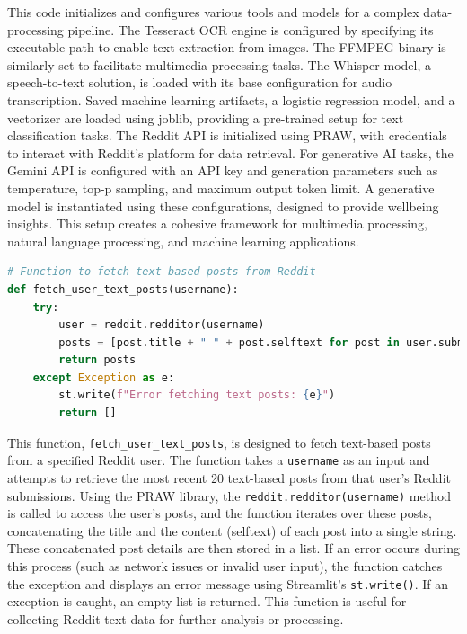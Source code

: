 \noindent
This code initializes and configures various tools and models for a complex data-processing pipeline. The Tesseract OCR engine is configured by specifying its executable path to enable text extraction from images. The FFMPEG binary is similarly set to facilitate multimedia processing tasks. The Whisper model, a speech-to-text solution, is loaded with its base configuration for audio transcription. Saved machine learning artifacts, a logistic regression model, and a vectorizer are loaded using joblib, providing a pre-trained setup for text classification tasks. The Reddit API is initialized using PRAW, with credentials to interact with Reddit's platform for data retrieval. For generative AI tasks, the Gemini API is configured with an API key and generation parameters such as temperature, top-p sampling, and maximum output token limit. A generative model is instantiated using these configurations, designed to provide wellbeing insights. This setup creates a cohesive framework for multimedia processing, natural language processing, and machine learning applications.


\begin{tcolorbox}[colback=gray!5!white, colframe=gray!80!black, boxrule=0.5pt, title=Fetching Reddit User Text Posts]
    \begin{lstlisting}[language=Python]
# Function to fetch text-based posts from Reddit
def fetch_user_text_posts(username):
    try:
        user = reddit.redditor(username)
        posts = [post.title + " " + post.selftext for post in user.submissions.new(limit=20)]
        return posts
    except Exception as e:
        st.write(f"Error fetching text posts: {e}")
        return []
    \end{lstlisting}
\end{tcolorbox}

\noindent
This function, \texttt{fetch\_user\_text\_posts}, is designed to fetch text-based posts from a specified Reddit user. The function takes a \texttt{username} as an input and attempts to retrieve the most recent 20 text-based posts from that user’s Reddit submissions. Using the PRAW library, the \texttt{reddit.redditor(username)} method is called to access the user’s posts, and the function iterates over these posts, concatenating the title and the content (selftext) of each post into a single string. These concatenated post details are then stored in a list. If an error occurs during this process (such as network issues or invalid user input), the function catches the exception and displays an error message using Streamlit’s \texttt{st.write()}. If an exception is caught, an empty list is returned. This function is useful for collecting Reddit text data for further analysis or processing.


